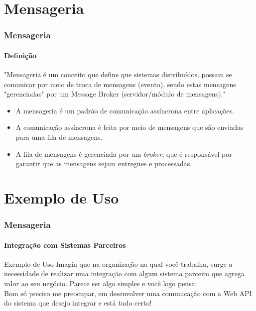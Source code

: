 \documentclass[
	9pt, %
	t, %
]{beamer}
\newcommand{\yellowbox}[1]{\colorbox{yellow!75}{#1}}
\begin{document}
\section{Mensageria}


\begin{frame}
	\frametitle{Mensageria}
	\framesubtitle{Definição}

	"Mensageria é um conceito que define que sistemas distribuídos, possam se comunicar por meio de troca de mensagens (evento), sendo estas mensagens "gerenciadas" por um Message Broker (servidor/módulo de mensagens)."

	\begin{itemize}
		\item A mensageria é um padrão de comunicação \yellowbox{assíncrona} entre aplicações.
		\item A comunicação assíncrona é feita por meio de mensagens que são enviadas para uma \yellowbox{fila de mensagens}.
		\item A fila de mensagens é gerenciada por um \textit{broker}, que é responsável por garantir que as mensagens sejam entregues e processadas.
	\end{itemize}

\end{frame}


\section{Exemplo de Uso}

\begin{frame}
	\frametitle{Mensageria}
	\framesubtitle{Integração com Sistemas Parceiros}

	\begin{block}{Exemplo de Uso}
		Imagin que na organização na qual você trabalha, surge a necessidade de realizar uma integração com algum sistema parceiro que agrega valor ao seu negócio. Parece ser algo simples e você logo pensa:
		\\ \bigskip
		\alert{Bom só preciso me preocupar, em desenvolver uma comunicação com a Web API do sistema que desejo integrar e está tudo certo!}

	\end{block}

\end{frame}
\end{document}
